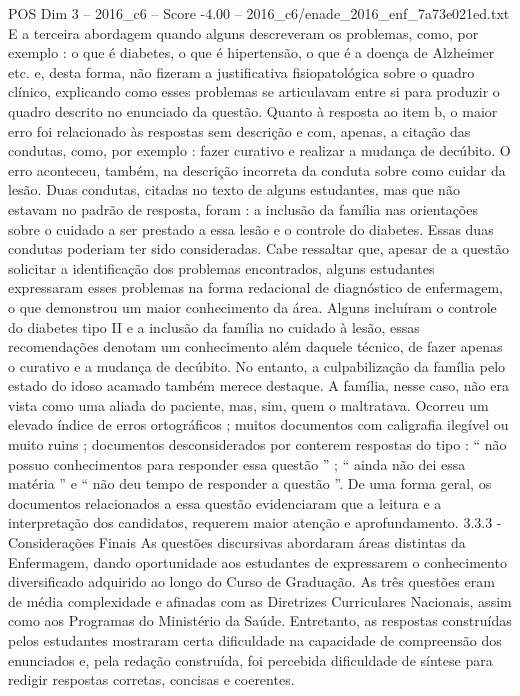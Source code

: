 \begin{textsample}{POS Dim 3 – 2016\_c6 – Score -4.00 – 2016\_c6/enade\_2016\_enf\_7a73e021ed.txt}
E a terceira abordagem quando alguns descreveram os problemas, como, por exemplo : o que é diabetes, o que é hipertensão, o que é a doença de Alzheimer etc. e, desta forma, não fizeram a justificativa fisiopatológica sobre o quadro clínico, explicando como esses problemas se articulavam entre si para produzir o quadro descrito no enunciado da questão.
Quanto à resposta ao item b, o maior erro foi relacionado às respostas sem descrição e com, apenas, a citação das condutas, como, por exemplo : fazer curativo e realizar a mudança de decúbito.
O erro aconteceu, também, na descrição incorreta da conduta sobre como cuidar da lesão.
Duas condutas, citadas no texto de alguns estudantes, mas que não estavam no padrão de resposta, foram : a inclusão da família nas orientações sobre o cuidado a ser prestado a essa lesão e o controle do diabetes.
Essas duas condutas poderiam ter sido consideradas.
Cabe ressaltar que, apesar de a questão solicitar a identificação dos problemas encontrados, alguns estudantes expressaram esses problemas na forma redacional de diagnóstico de enfermagem, o que demonstrou um maior conhecimento da área.
Alguns incluíram o controle do diabetes tipo II e a inclusão da família no cuidado à lesão, essas recomendações denotam um conhecimento além daquele técnico, de fazer apenas o curativo e a mudança de decúbito.
No entanto, a culpabilização da família pelo estado do idoso acamado também merece destaque.
A família, nesse caso, não era vista como uma aliada do paciente, mas, sim, quem o maltratava.
Ocorreu um elevado índice de erros ortográficos ; muitos documentos com caligrafia ilegível ou muito ruins ; documentos desconsiderados por conterem respostas do tipo : “ não possuo conhecimentos para responder essa questão ” ; “ ainda não dei essa matéria ” e “ não deu tempo de responder a questão ”.
De uma forma geral, os documentos relacionados a essa questão evidenciaram que a leitura e a interpretação dos candidatos, requerem maior atenção e aprofundamento. 3.3.3 - Considerações Finais As questões discursivas abordaram áreas distintas da Enfermagem, dando oportunidade aos estudantes de expressarem o conhecimento diversificado adquirido ao longo do Curso de Graduação.
As três questões eram de média complexidade e afinadas com as Diretrizes Curriculares Nacionais, assim como aos Programas do Ministério da Saúde.
Entretanto, as respostas construídas pelos estudantes mostraram certa dificuldade na capacidade de compreensão dos enunciados e, pela redação construída, foi percebida dificuldade de síntese para redigir respostas corretas, concisas e coerentes.

\end{textsample}
